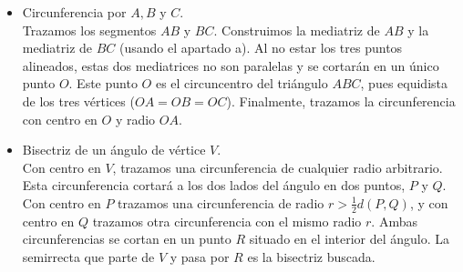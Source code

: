 \begin{enumerate}
\begin{itemize}
    \item[d)] Circunferencia por $A, B$ y $C$. \\ 
    Trazamos los segmentos $AB$ y $BC$. Construimos la mediatriz de $AB$ y la mediatriz de $BC$ (usando el apartado a). Al no estar los tres puntos alineados, estas dos mediatrices no son paralelas y se cortarán en un único punto $O$. Este punto $O$ es el circuncentro del triángulo $ABC$, pues equidista de los tres vértices ($OA = OB = OC$). Finalmente, trazamos la circunferencia con centro en $O$ y radio $OA$.

    \item[e)] Bisectriz de un ángulo de vértice $V$. \\ 
    Con centro en $V$, trazamos una circunferencia de cualquier radio arbitrario. Esta circunferencia cortará a los dos lados del ángulo en dos puntos, $P$ y $Q$. Con centro en $P$ trazamos una circunferencia de radio $r > \frac{1}{2}d(P,Q)$, y con centro en $Q$ trazamos otra circunferencia con el mismo radio $r$. Ambas circunferencias se cortan en un punto $R$ situado en el interior del ángulo. La semirrecta que parte de $V$ y pasa por $R$ es la bisectriz buscada.


\end{itemize}
\end{enumerate}
